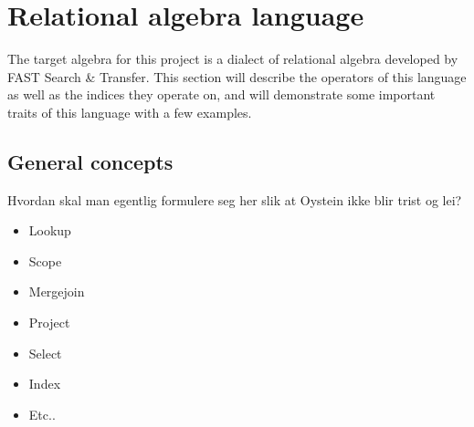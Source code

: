 \section{Relational algebra language}
The target algebra for this project is a dialect of relational algebra
developed by FAST Search \& Transfer. This section will describe the operators
of this language as well as the indices they operate on, and will demonstrate some 
important traits of this language with a few examples.

\subsection{General concepts}
Hvordan skal man egentlig formulere seg her slik at Oystein ikke blir trist og
lei?

\begin{itemize}
  \item Lookup
  \item Scope
  \item Mergejoin
  \item Project
  \item Select
  \item Index
  \item Etc..
\end{itemize}

